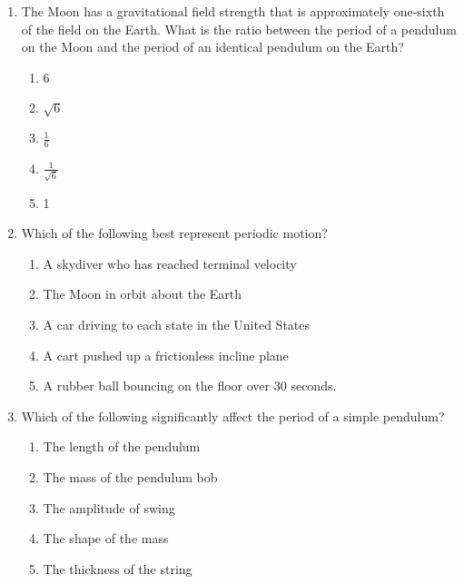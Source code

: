 \documentclass{../../../oss-apphys}
\begin{document}
\begin{multicols}{2}
\begin{enumerate}[leftmargin=18pt]
  \item The Moon has a gravitational field strength that is approximately
    one-sixth of the field on the Earth. What is the ratio between the period
    of a pendulum on the Moon and the period of an identical pendulum on the
    Earth?
    \begin{enumerate}[nosep,leftmargin=18pt,label=(\Alph*)]
    \item 6
    \item $\sqrt{6}$
    \item $\displaystyle\frac16$
    \item $\displaystyle\frac1{\sqrt{6}}$
    \item 1
    \end{enumerate}

  \item Which of the following best represent periodic motion?
    \begin{enumerate}[noitemsep,topsep=0pt,leftmargin=18pt,label=(\Alph*)]
    \item A skydiver who has reached terminal velocity
    \item The Moon in orbit about the Earth
    \item A car driving to each state in the United States
    \item A cart pushed up a frictionless incline plane
    \item A rubber ball bouncing on the floor over 30 seconds.
    \end{enumerate}
    \vspace{.7in}
    
  \item  Which of the following significantly affect the period of a simple
    pendulum?
    \begin{enumerate}[nosep,leftmargin=18pt,label=(\Alph*)]
    \item The length of the pendulum
    \item The mass of the pendulum bob
    \item The amplitude of swing
    \item The shape of the mass
    \item The thickness of the string
    \end{enumerate}
    \vspace{.7in}
  \end{enumerate}
  \columnbreak
  

\end{multicols}
\end{document}

